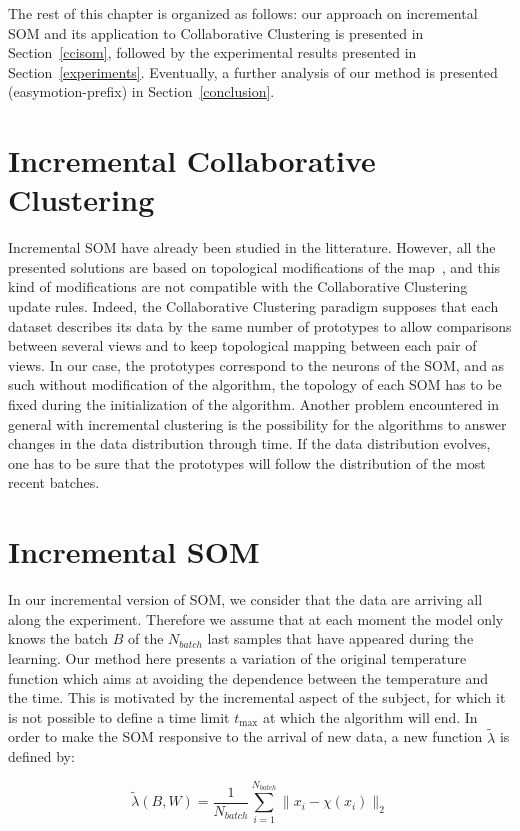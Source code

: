     The rest of this chapter is organized as follows: our approach on incremental SOM and its application to Collaborative Clustering is presented in Section~\ref{ccisom}, followed by the experimental results presented in Section~\ref{experiments}. Eventually, a further analysis of our method is presented (easymotion-prefix) in Section~\ref{conclusion}.
	
	\section{Incremental Collaborative Clustering}
    Incremental SOM have already been studied in the litterature. However, all the presented solutions are based on topological modifications of the map~\cite{deng2000esom,paplinski2012incremental}, and this kind of modifications are not compatible with the Collaborative Clustering update rules. Indeed, the Collaborative Clustering paradigm supposes that each dataset describes its data by the same number of prototypes to allow comparisons between several views and to keep topological mapping between each pair of views. In our case, the prototypes correspond to the neurons of the SOM, and as such without modification of the algorithm, the topology of each SOM has to be fixed during the initialization of the algorithm. Another problem encountered in general with incremental clustering is the possibility for the algorithms to answer changes in the data distribution through time. If the data distribution evolves, one has to be sure that the prototypes will follow the distribution of the most recent batches.
	
	\section{Incremental SOM}
\label{sectionisom}
	In our incremental version of SOM, we consider that the data are arriving all along the experiment. Therefore we assume that at each moment the model only knows the batch $B$ of the $N_{batch}$ last samples that have appeared during the learning.
	Our method here presents a variation of the original temperature function which aims at avoiding the dependence between the temperature and the time. This is motivated by the incremental aspect of the subject, for which it is not possible to define a time limit $t_{\max}$ at which the algorithm will end. In order to make the SOM responsive to the arrival of new data, a new function $\widetilde{\lambda}$ is defined by:
	
	\begin{equation}
	\widetilde{\lambda}(B, W) = \frac{1}{N_{batch}}\sum_{i=1}^{N_{batch}}\|x_i - \chi(x_i)\|_2
	\end{equation}
	
